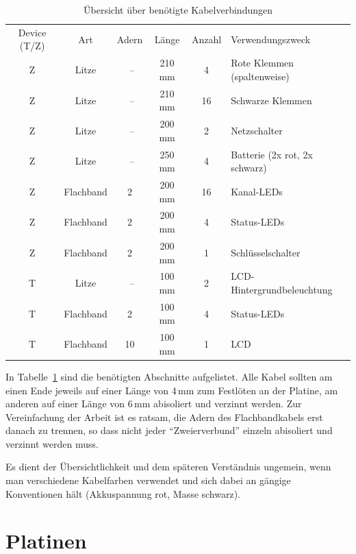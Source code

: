 \documentclass[paper=a4, parskip, numbers=noenddot, toc=listof, headsepline]{scrbook}
\begin{document}
			\begin{table}
				\centering
				\begin{tabularx}{\textwidth}{cccccX}
					\hline\hline
					Device (T/Z) & Art       & Adern & Länge & Anzahl & Verwendungszweck              \\
					Z            & Litze     & ~--   & 210 mm & 4      & Rote Klemmen (spaltenweise)   \\
					Z            & Litze     & ~--   & 210 mm & 16     & Schwarze Klemmen              \\
					Z            & Litze     & ~--   & 200 mm & 2      & Netzschalter                  \\
					Z            & Litze     & ~--   & 250 mm & 4      & Batterie (2x rot, 2x schwarz) \\
					Z            & Flachband & 2     & 200 mm & 16     & Kanal-LEDs                    \\
					Z            & Flachband & 2     & 200 mm & 4      & Status-LEDs                   \\
					Z            & Flachband & 2     & 200 mm & 1      & Schlüsselschalter            \\ \hline
					T            & Litze     & ~--   & 100 mm & 2      & LCD-Hintergrundbeleuchtung    \\
					T            & Flachband & 2     & 100 mm & 4      & Status-LEDs                   \\
					T            & Flachband & 10    & 100 mm & 1      & LCD                           \\ \hline\hline
				\end{tabularx}
				\caption{Übersicht über benötigte Kabelverbindungen}
				\label{tab:kabel}
			\end{table}

			In Tabelle~\ref{tab:kabel} sind die benötigten Abschnitte aufgelistet. Alle Kabel sollten am einen Ende jeweils auf einer Länge von 4\,mm zum Festlöten an der Platine, am anderen auf einer Länge von 6\,mm abisoliert und verzinnt werden. Zur Vereinfachung der Arbeit ist es ratsam, die Adern des Flachbandkabels erst danach zu trennen, so dass nicht jeder \enquote{Zweierverbund} einzeln abisoliert und verzinnt werden muss.

			Es dient der Übersichtlichkeit und dem späteren Verständnis ungemein, wenn man verschiedene Kabelfarben verwendet und sich dabei an gängige Konventionen hält (Akkuspannung rot, Masse schwarz).

		\section{Platinen}
\end{document}
